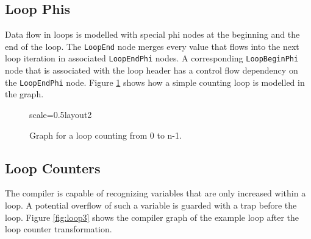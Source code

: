 \documentclass[twocolumn]{svjour3}
\newcommand\nodename[1]{\texttt{#1}}
\begin{document}
\subsection{Loop Phis}
Data flow in loops is modelled with special phi nodes at the beginning and the end of the loop.
The \nodename{LoopEnd} node merges every value that flows into the next loop iteration in associated \nodename{LoopEndPhi} nodes.
A corresponding \nodename{LoopBeginPhi} node that is associated with the loop header has a control flow dependency on the \nodename{LoopEndPhi} node.
Figure \ref{fig:loop2} shows how a simple counting loop is modelled in the graph.

\begin{figure}[h]
  \label{fig:loop2}
  \centering
\begin{digraphenv}{scale=0.5}{layout2}
\end{digraphenv}
  \caption{Graph for a loop counting from 0 to n-1.}
\end{figure}

\subsection{Loop Counters}
The compiler is capable of recognizing variables that are only increased within a loop.
A potential overflow of such a variable is guarded with a trap before the loop.
Figure \ref{fig:loop3} shows the compiler graph of the example loop after the loop counter transformation.
\end{document}
